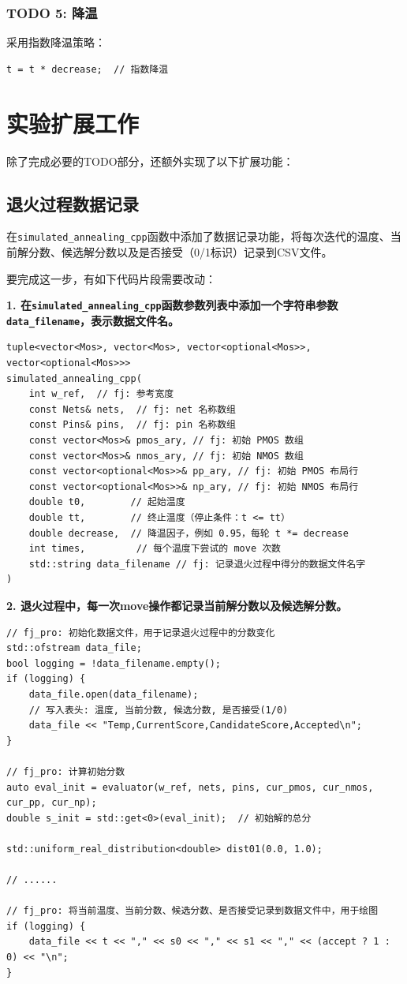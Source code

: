 \documentclass[UTF8,12pt,a4paper]{ctexart}
\begin{document}
\subsubsection{TODO 5: 降温}

采用指数降温策略：

\begin{lstlisting}
t = t * decrease;  // 指数降温
\end{lstlisting}

\newpage
\section{实验扩展工作}

除了完成必要的TODO部分，还额外实现了以下扩展功能：

\subsection{退火过程数据记录}

在\texttt{simulated\_annealing\_cpp}函数中添加了数据记录功能，将每次迭代的温度、当前解分数、候选解分数以及是否接受（0/1标识）记录到CSV文件。

要完成这一步，有如下代码片段需要改动：

\textbf{1. 在\texttt{simulated\_annealing\_cpp}函数参数列表中添加一个字符串参数\texttt{data\_filename}，表示数据文件名。}
\begin{lstlisting}
tuple<vector<Mos>, vector<Mos>, vector<optional<Mos>>, vector<optional<Mos>>>
simulated_annealing_cpp(
	int w_ref,  // fj: 参考宽度
	const Nets& nets,  // fj: net 名称数组
	const Pins& pins,  // fj: pin 名称数组
	const vector<Mos>& pmos_ary, // fj: 初始 PMOS 数组
	const vector<Mos>& nmos_ary, // fj: 初始 NMOS 数组
	const vector<optional<Mos>>& pp_ary, // fj: 初始 PMOS 布局行
	const vector<optional<Mos>>& np_ary, // fj: 初始 NMOS 布局行
	double t0,        // 起始温度
	double tt,        // 终止温度（停止条件：t <= tt）
	double decrease,  // 降温因子，例如 0.95，每轮 t *= decrease
	int times,         // 每个温度下尝试的 move 次数
	std::string data_filename // fj: 记录退火过程中得分的数据文件名字
) 
\end{lstlisting}

\textbf{2. 退火过程中，每一次move操作都记录当前解分数以及候选解分数。}
\begin{lstlisting}
// fj_pro: 初始化数据文件，用于记录退火过程中的分数变化
std::ofstream data_file;
bool logging = !data_filename.empty();
if (logging) {
	data_file.open(data_filename);
	// 写入表头: 温度, 当前分数, 候选分数, 是否接受(1/0)
	data_file << "Temp,CurrentScore,CandidateScore,Accepted\n";
}

// fj_pro: 计算初始分数
auto eval_init = evaluator(w_ref, nets, pins, cur_pmos, cur_nmos, cur_pp, cur_np);
double s_init = std::get<0>(eval_init);  // 初始解的总分

std::uniform_real_distribution<double> dist01(0.0, 1.0);

// ......

// fj_pro: 将当前温度、当前分数、候选分数、是否接受记录到数据文件中，用于绘图
if (logging) {
	data_file << t << "," << s0 << "," << s1 << "," << (accept ? 1 : 0) << "\n";
}
\end{lstlisting}
\end{document}
